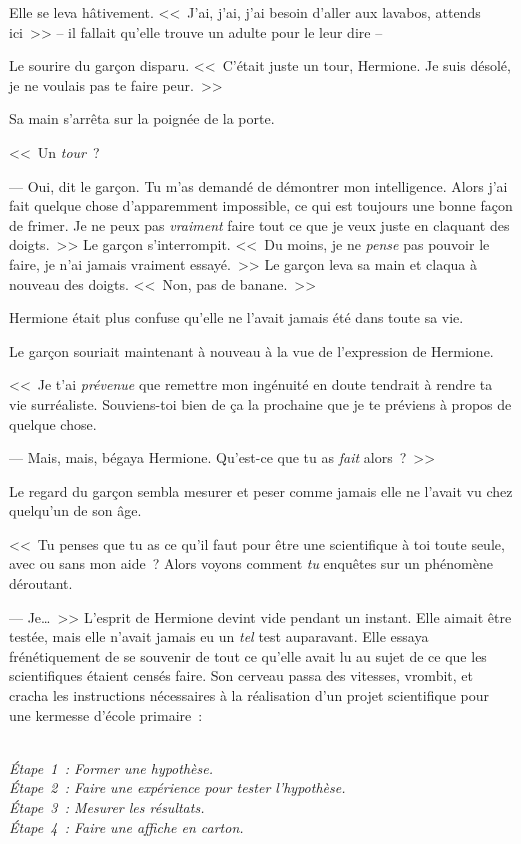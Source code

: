 Elle se leva hâtivement. <<~J'ai, j'ai, j'ai besoin d'aller aux lavabos, attends ici~>> -- il fallait qu'elle trouve un adulte pour le leur dire --

Le sourire du garçon disparu. <<~C'était juste un tour, Hermione. Je suis désolé, je ne voulais pas te faire peur.~>>

Sa main s'arrêta sur la poignée de la porte.

<<~Un \emph{tour}~?

--- Oui, dit le garçon. Tu m'as demandé de démontrer mon intelligence. Alors j'ai fait quelque chose d'apparemment impossible, ce qui est toujours une bonne façon de frimer. Je ne peux pas \emph{vraiment} faire tout ce que je veux juste en claquant des doigts.~>> Le garçon s'interrompit. <<~Du moins, je ne \emph{pense} pas pouvoir le faire, je n'ai jamais vraiment essayé.~>> Le garçon leva sa main et claqua à nouveau des doigts. <<~Non, pas de banane.~>>

Hermione était plus confuse qu'elle ne l'avait jamais été dans toute sa vie.

Le garçon souriait maintenant à nouveau à la vue de l'expression de Hermione.

<<~Je t'ai \emph{prévenue} que remettre mon ingénuité en doute tendrait à rendre ta vie surréaliste. Souviens-toi bien de ça la prochaine que je te préviens à propos de quelque chose.

--- Mais, mais, bégaya Hermione. Qu'est-ce que tu as \emph{fait} alors~?~>>

Le regard du garçon sembla mesurer et peser comme jamais elle ne l'avait vu chez quelqu'un de son âge.

<<~Tu penses que tu as ce qu'il faut pour être une scientifique à toi toute seule, avec ou sans mon aide~? Alors voyons comment \emph{tu} enquêtes sur un phénomène déroutant.

--- Je…~>> L'esprit de Hermione devint vide pendant un instant. Elle aimait être testée, mais elle n'avait jamais eu un \emph{tel} test auparavant. Elle essaya frénétiquement de se souvenir de tout ce qu'elle avait lu au sujet de ce que les scientifiques étaient censés faire. Son cerveau passa des vitesses, vrombit, et cracha les instructions nécessaires à la réalisation d'un projet scientifique pour une kermesse d'école primaire~:

\emph{\\ 
Étape~1~: Former une hypothèse.\\
Étape~2~: Faire une expérience pour tester l'hypothèse.\\
Étape~3~: Mesurer les résultats.\\
Étape~4~: Faire une affiche en carton.\\
}

